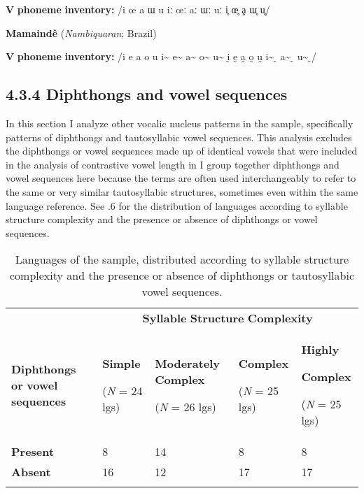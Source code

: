 \textbf{V} \textbf{phoneme} \textbf{inventory:} /i œ a ɯ u iː œː aː ɯː uː i̥ œ̥ ḁ ɯ̥ u̥/
\z



\ea\label{ex:(4.16)}
  \textbf{Mamaindê} (\textit{Nambiquaran}; Brazil)



\textbf{V} \textbf{phoneme} \textbf{inventory:} /i e a o u i\~{}  e\~{}  a\~{}  o\~{}  u\~{}  ḭ ḛ a̰ o̰ ṵ i\~{} ̰ a\~{} ̰ u\~{} ̰/
\z


\subsection{\rmfamily} 
\subsection{4.3.4 Diphthongs and vowel sequences}

  In this section I analyze other vocalic nucleus patterns in the sample, specifically patterns of diphthongs and tautosyllabic vowel sequences. This analysis excludes the diphthongs or vowel sequences made up of identical vowels that were included in the analysis of contrastive vowel length in  I group together diphthongs and vowel sequences here because the terms are often used interchangeably to refer to the same or very similar tautosyllabic structures, sometimes even within the same language reference. See .6 for the distribution of languages according to syllable structure complexity and the presence or absence of diphthongs or vowel sequences.






\begin{table}
\begin{tabularx}{\textwidth}{XXXXX}
 & \multicolumn{4}{c}{ \textbf{Syllable} \textbf{Structure} \textbf{Complexity}}\\
\lsptoprule
\textbf{Diphthongs} \textbf{or} \textbf{vowel} \textbf{sequences} & { \textbf{Simple}}

 (\textit{N} = 24 lgs) & { \textbf{Moderately} \textbf{Complex}}

 (\textit{N} = 26 lgs) & { \textbf{Complex}}

 (\textit{N} = 25 lgs) & { \textbf{Highly} }

{ \textbf{Complex}}

 (\textit{N} = 25 lgs)\\
\textbf{Present} & 8 & 14 & 8 & 8\\
\textbf{Absent} & 16 & 12 & 17 & 17\\
\lspbottomrule
\end{tabularx}
\caption{\label{4.6}Languages of the sample, distributed according to syllable structure complexity and the presence or absence of diphthongs or tautosyllabic vowel sequences.}
\end{table}




